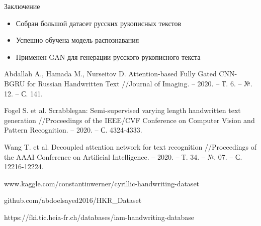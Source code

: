 \documentclass[fleqn, xcolor=x11names]{beamer}
\begin{document}

\begin{frame}{Заключение}
    \begin{itemize}
        \item Собран большой датасет русских рукописных текстов
        \item Успешно обучена модель распознавания
        \item Применен GAN для генерации русского рукописного текста
    \end{itemize}
\end{frame}

\begin{frame}
    \begin{thebibliography}{9}
        Abdallah A., Hamada M., Nurseitov D.
        Attention-based Fully Gated CNN-BGRU for Russian Handwritten Text //Journal of Imaging. – 2020. – Т. 6. – №. 12. – С. 141.

        Fogel S. et al. Scrabblegan: Semi-supervised varying length handwritten
        text generation //Proceedings of the IEEE/CVF Conference on 
        Computer Vision and Pattern Recognition. – 2020. – С. 4324-4333.

        Wang T. et al. Decoupled attention network for text recognition 
        //Proceedings of the AAAI Conference on Artificial Intelligence. – 2020. – Т. 34. – №. 07. – С. 12216-12224.

        www.kaggle.com/constantinwerner/cyrillic-handwriting-dataset

        github.com/abdoelsayed2016/HKR\_Dataset

        https://fki.tic.heia-fr.ch/databases/iam-handwriting-database

    \end{thebibliography}
\end{frame}
\end{document}
